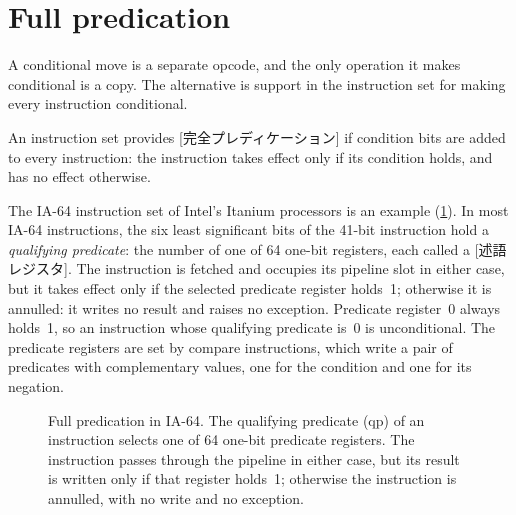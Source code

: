 \documentclass[../main.tex]{subfiles}
\begin{document}
\section{Full predication}
\label{sec:l05-full}

A conditional move is a separate opcode, and the only operation it makes
conditional is a copy.
The alternative is support in the instruction set for making every
instruction conditional.

\begin{definition}
  \label{def:l05-full-predication}
  An instruction set provides [完全プレディケーション]
  if condition bits are added to every instruction: the instruction takes
  effect only if its condition holds, and has no effect otherwise.
\end{definition}

The IA-64 instruction set of Intel's Itanium processors is an
example (\cref{fig:l05-qp}).  In most IA-64 instructions, the
six least significant bits of the 41-bit instruction hold a \emph{qualifying
predicate}: the number of one of 64 one-bit registers, each called a
[述語レジスタ].  The instruction is fetched and
occupies its pipeline slot in either case, but it takes effect only if the
selected predicate register holds~1; otherwise it is annulled: it writes no
result and raises no exception.  Predicate register~0 always holds~1, so an
instruction whose qualifying predicate is~0 is unconditional.
The predicate registers are set by compare instructions, which write a pair
of predicates with complementary values, one for the condition and one for
its negation.

\begin{figure}[htbp]
  \centering
  
  \caption{Full predication in IA-64.  The qualifying predicate (qp) of an
    instruction selects one of 64 one-bit predicate registers.  The
    instruction passes through the pipeline in either case, but its result is
    written only if that register holds~1; otherwise the instruction is
    annulled, with no write and no exception.}
  \label{fig:l05-qp}
\end{figure}
\end{document}
